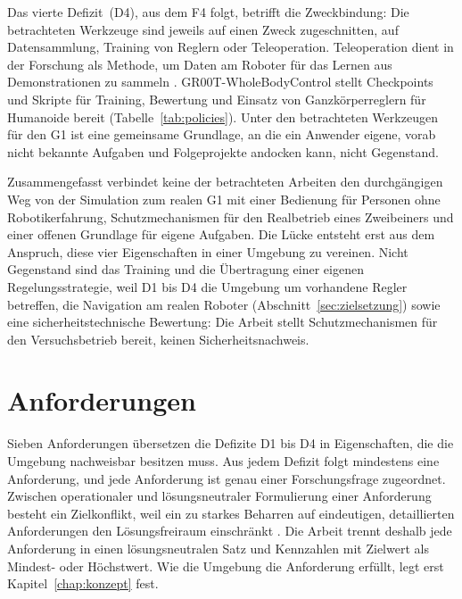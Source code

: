 Das vierte Defizit~(D4), aus dem F4 folgt, betrifft die Zweckbindung: Die betrachteten Werkzeuge sind jeweils auf einen Zweck zugeschnitten, auf Datensammlung, Training von Reglern oder Teleoperation.
Teleoperation dient in der Forschung als Methode, um Daten am Roboter für das Lernen aus Demonstrationen zu sammeln \cite{Cheng2024}.
GR00T-WholeBodyControl stellt Checkpoints und Skripte für Training, Bewertung und Einsatz von Ganzkörperreglern für Humanoide bereit \cite{NvidiaGR00TWBC} (Tabelle~\ref{tab:policies}).
Unter den betrachteten Werkzeugen für den G1 ist eine gemeinsame Grundlage, an die ein Anwender eigene, vorab nicht bekannte Aufgaben und Folgeprojekte andocken kann, nicht Gegenstand.

Zusammengefasst verbindet keine der betrachteten Arbeiten den durchgängigen Weg von der Simulation zum realen G1 mit einer Bedienung für Personen ohne Robotikerfahrung, Schutzmechanismen für den Realbetrieb eines Zweibeiners und einer offenen Grundlage für eigene Aufgaben. Die Lücke entsteht erst aus dem Anspruch, diese vier Eigenschaften in einer Umgebung zu vereinen.
Nicht Gegenstand sind das Training und die Übertragung einer eigenen Regelungsstrategie, weil D1 bis D4 die Umgebung um vorhandene Regler betreffen, die Navigation am realen Roboter (Abschnitt~\ref{sec:zielsetzung}) sowie eine sicherheitstechnische Bewertung: Die Arbeit stellt Schutzmechanismen für den Versuchsbetrieb bereit, keinen Sicherheitsnachweis.

\section{Anforderungen}
\label{sec:anforderungen}
Sieben Anforderungen übersetzen die Defizite D1 bis D4 in Eigenschaften, die die Umgebung nachweisbar besitzen muss.
Aus jedem Defizit folgt mindestens eine Anforderung, und jede Anforderung ist genau einer Forschungsfrage zugeordnet.
Zwischen operationaler und lösungsneutraler Formulierung einer Anforderung besteht ein Zielkonflikt, weil ein zu starkes Beharren auf eindeutigen, detaillierten Anforderungen den Lösungsfreiraum einschränkt \cite{Bender2021}.
Die Arbeit trennt deshalb jede Anforderung in einen lösungsneutralen Satz und Kennzahlen mit Zielwert als Mindest- oder Höchstwert. Wie die Umgebung die Anforderung erfüllt, legt erst Kapitel~\ref{chap:konzept} fest.


